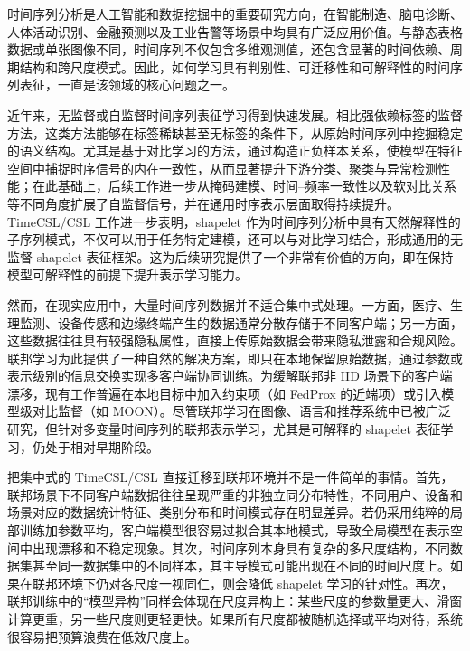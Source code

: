 \documentclass{article}
\begin{document}
时间序列分析是人工智能和数据挖掘中的重要研究方向，在智能制造、脑电诊断、人体活动识别、金融预测以及工业告警等场景中均具有广泛应用价值。与静态表格数据或单张图像不同，时间序列不仅包含多维观测值，还包含显著的时间依赖、周期结构和跨尺度模式。因此，如何学习具有判别性、可迁移性和可解释性的时间序列表征，一直是该领域的核心问题之一。

近年来，无监督或自监督时间序列表征学习得到快速发展。相比强依赖标签的监督方法，这类方法能够在标签稀缺甚至无标签的条件下，从原始时间序列中挖掘稳定的语义结构。尤其是基于对比学习的方法，通过构造正负样本关系，使模型在特征空间中捕捉时序信号的内在一致性，从而显著提升下游分类、聚类与异常检测性能\cite{ts2vec,tstcc,tfc}；在此基础上，后续工作进一步从掩码建模\cite{simmtm}、时间--频率一致性\cite{tfc}以及软对比关系\cite{softclt}等不同角度扩展了自监督信号，并在通用时序表示层面取得持续提升\cite{timesurl}。TimeCSL/CSL 工作进一步表明，shapelet 作为时间序列分析中具有天然解释性的子序列模式，不仅可以用于任务特定建模，还可以与对比学习结合，形成通用的无监督 shapelet 表征框架\cite{timescsl}。这为后续研究提供了一个非常有价值的方向，即在保持模型可解释性的前提下提升表示学习能力\cite{interpgn,unishape}。

然而，在现实应用中，大量时间序列数据并不适合集中式处理。一方面，医疗、生理监测、设备传感和边缘终端产生的数据通常分散存储于不同客户端；另一方面，这些数据往往具有较强隐私属性，直接上传原始数据会带来隐私泄露和合规风险。联邦学习为此提供了一种自然的解决方案，即只在本地保留原始数据，通过参数或表示级别的信息交换实现多客户端协同训练\cite{fedavg}。为缓解联邦非 IID 场景下的客户端漂移，现有工作普遍在本地目标中加入约束项（如 FedProx 的近端项\cite{fedprox}）或引入模型级对比监督（如 MOON\cite{moon}）。尽管联邦学习在图像、语言和推荐系统中已被广泛研究，但针对多变量时间序列的联邦表示学习，尤其是可解释的 shapelet 表征学习，仍处于相对早期阶段\cite{fedst,fedtsc}。

把集中式的 TimeCSL/CSL 直接迁移到联邦环境并不是一件简单的事情。首先，联邦场景下不同客户端数据往往呈现严重的非独立同分布特性，不同用户、设备和场景对应的数据统计特征、类别分布和时间模式存在明显差异。若仍采用纯粹的局部训练加参数平均，客户端模型很容易过拟合其本地模式，导致全局模型在表示空间中出现漂移和不稳定现象。其次，时间序列本身具有复杂的多尺度结构，不同数据集甚至同一数据集中的不同样本，其主导模式可能出现在不同的时间尺度上。如果在联邦环境下仍对各尺度一视同仁，则会降低 shapelet 学习的针对性。再次，联邦训练中的“模型异构”同样会体现在尺度异构上：某些尺度的参数量更大、滑窗计算更重，另一些尺度则更轻更快。如果所有尺度都被随机选择或平均对待，系统很容易把预算浪费在低效尺度上。
\end{document}

